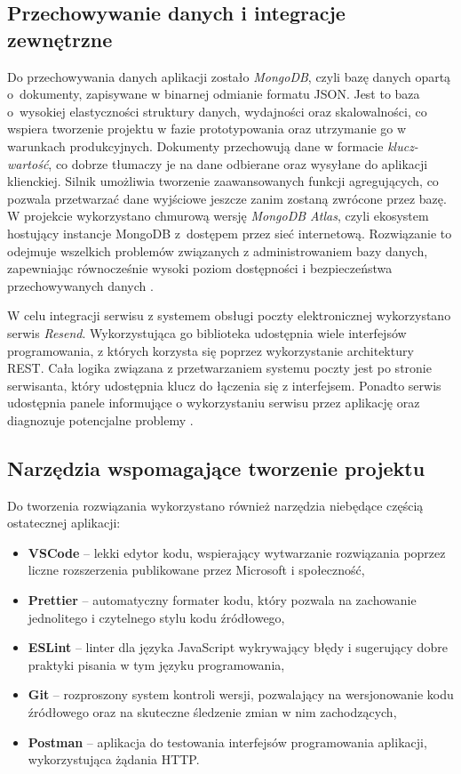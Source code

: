\subsection{Przechowywanie danych i integracje zewnętrzne}

Do przechowywania danych aplikacji zostało \emph{MongoDB}, czyli bazę danych opartą o~dokumenty, zapisywane w binarnej odmianie formatu JSON.
Jest to baza o~wysokiej elastyczności struktury danych, wydajności oraz skalowalności, co wspiera tworzenie projektu w fazie prototypowania oraz utrzymanie go w warunkach produkcyjnych.
Dokumenty przechowują dane w formacie \emph{klucz-wartość}, co dobrze tłumaczy je na dane odbierane oraz wysyłane do aplikacji klienckiej.
Silnik umożliwia tworzenie zaawansowanych funkcji agregujących, co pozwala przetwarzać dane wyjściowe jeszcze zanim zostaną zwrócone przez bazę.
W projekcie wykorzystano chmurową wersję \emph{MongoDB Atlas}, czyli ekosystem hostujący instancje MongoDB z~dostępem przez sieć internetową.
Rozwiązanie to odejmuje wszelkich problemów związanych z administrowaniem bazy danych, zapewniając równocześnie wysoki poziom dostępności i bezpieczeństwa przechowywanych danych \autocite{mongo_atlas}.

W celu integracji serwisu z systemem obsługi poczty elektronicznej wykorzystano serwis \emph{Resend}.
Wykorzystująca go biblioteka udostępnia wiele interfejsów programowania, z których korzysta się poprzez wykorzystanie architektury REST.
Cała logika związana z przetwarzaniem systemu poczty jest po stronie serwisanta, który udostępnia klucz do łączenia się z interfejsem.
Ponadto serwis udostępnia panele informujące o wykorzystaniu serwisu przez aplikację oraz diagnozuje potencjalne problemy \autocite{resend_emailapi}.

\subsection{Narzędzia wspomagające tworzenie projektu}

Do tworzenia rozwiązania wykorzystano również narzędzia niebędące częścią ostatecznej aplikacji:
%
\begin{itemize}
    \item \textbf{VSCode} -- lekki edytor kodu, wspierający wytwarzanie rozwiązania poprzez liczne rozszerzenia publikowane przez Microsoft i społeczność,
    \item \textbf{Prettier} -- automatyczny formater kodu, który pozwala na zachowanie jednolitego i czytelnego stylu kodu źródłowego,
    \item \textbf{ESLint} -- linter dla języka JavaScript wykrywający błędy i sugerujący dobre praktyki pisania w tym języku programowania,
    \item \textbf{Git} -- rozproszony system kontroli wersji, pozwalający na wersjonowanie kodu źródłowego oraz na skuteczne śledzenie zmian w nim zachodzących,
    \item \textbf{Postman} -- aplikacja do testowania interfejsów programowania aplikacji, wykorzystująca żądania HTTP.
\end{itemize}
